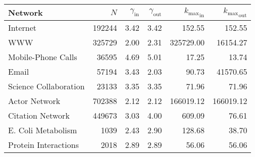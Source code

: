 \begin{tabular}{lrrrrr}
\toprule\toprule
Network & $N$ & $\gamma_\text{in}$ & $\gamma_\text{out}$ & ${k_{\max}}_\text{in}$ & ${k_{\max}}_\text{out}$ \\
\midrule
Internet & 192244 & 3.42 & 3.42 & 152.55 & 152.55 \\
WWW & 325729 & 2.00 & 2.31 & 325729.00 & 16154.27 \\
Mobile-Phone Calls & 36595 & 4.69 & 5.01 & 17.25 & 13.74 \\
Email & 57194 & 3.43 & 2.03 & 90.73 & 41570.65 \\
Science Collaboration & 23133 & 3.35 & 3.35 & 71.96 & 71.96 \\
Actor Network & 702388 & 2.12 & 2.12 & 166019.12 & 166019.12 \\
Citation Network & 449673 & 3.03 & 4.00 & 609.09 & 76.61 \\
E. Coli Metabolism & 1039 & 2.43 & 2.90 & 128.68 & 38.70 \\
Protein Interactions & 2018 & 2.89 & 2.89 & 56.06 & 56.06 \\
\bottomrule\bottomrule
\end{tabular}
